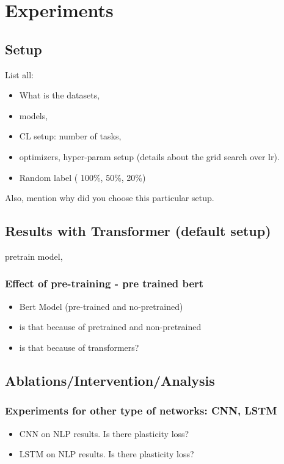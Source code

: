 \section{Experiments}

\subsection{Setup}
List all:
\begin{itemize}
    \item What is the datasets,
    \item  models,
    \item CL setup: number of tasks,
    \item optimizers, hyper-param setup (details about the grid search over lr).
    \item Random label ( 100\%, 50\%, 20\%)
\end{itemize}
Also, mention why did you choose this particular setup.


\subsection{Results with Transformer (default setup)}

pretrain model,

\subsubsection{Effect of pre-training - pre trained bert}
\begin{itemize}
    \item Bert Model (pre-trained and no-pretrained)
    \item is that because of pretrained and non-pretrained
    \item is that because of transformers?
\end{itemize}


\subsection{Ablations/Intervention/Analysis}

\subsubsection{Experiments for other type of networks: CNN, LSTM}
\begin{itemize}
    \item CNN on NLP results. Is there plasticity loss?
    \item LSTM on NLP results. Is there plasticity loss?
\end{itemize}

